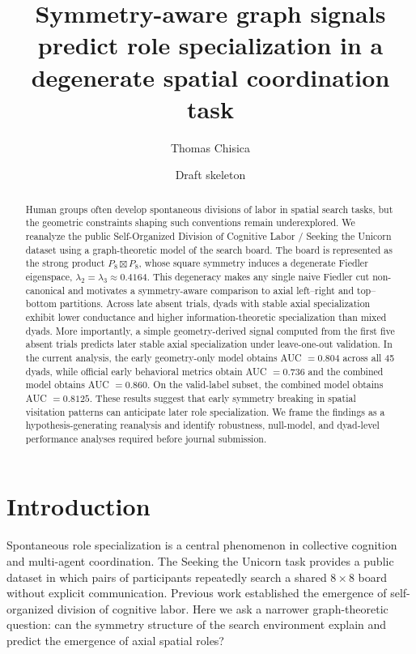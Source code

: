 \documentclass[11pt]{article}
\title{Symmetry-aware graph signals predict role specialization in a degenerate spatial coordination task}
\author{Thomas Chisica}
\date{Draft skeleton}
\begin{document}
\maketitle

\begin{abstract}
Human groups often develop spontaneous divisions of labor in spatial search tasks, but the geometric constraints shaping such conventions remain underexplored. We reanalyze the public Self-Organized Division of Cognitive Labor / Seeking the Unicorn dataset using a graph-theoretic model of the search board. The board is represented as the strong product $P_8 \boxtimes P_8$, whose square symmetry induces a degenerate Fiedler eigenspace, $\lambda_2=\lambda_3 \approx 0.4164$. This degeneracy makes any single naive Fiedler cut non-canonical and motivates a symmetry-aware comparison to axial left--right and top--bottom partitions. Across late absent trials, dyads with stable axial specialization exhibit lower conductance and higher information-theoretic specialization than mixed dyads. More importantly, a simple geometry-derived signal computed from the first five absent trials predicts later stable axial specialization under leave-one-out validation. In the current analysis, the early geometry-only model obtains AUC $=0.804$ across all 45 dyads, while official early behavioral metrics obtain AUC $=0.736$ and the combined model obtains AUC $=0.860$. On the valid-label subset, the combined model obtains AUC $=0.8125$. These results suggest that early symmetry breaking in spatial visitation patterns can anticipate later role specialization. We frame the findings as a hypothesis-generating reanalysis and identify robustness, null-model, and dyad-level performance analyses required before journal submission.
\end{abstract}

\section{Introduction}

Spontaneous role specialization is a central phenomenon in collective cognition and multi-agent coordination. The Seeking the Unicorn task provides a public dataset in which pairs of participants repeatedly search a shared $8\times 8$ board without explicit communication. Previous work established the emergence of self-organized division of cognitive labor. Here we ask a narrower graph-theoretic question: can the symmetry structure of the search environment explain and predict the emergence of axial spatial roles?
\end{document}
